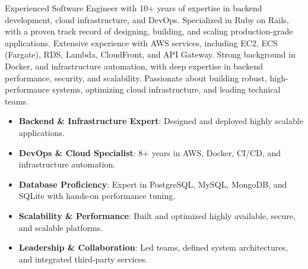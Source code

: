 \documentclass[10pt,a4paper,ragged2e,withhyper]{altacv}
\begin{document}
\begin{paracol}{2}
Experienced Software Engineer with 10+ years of expertise in backend development, cloud infrastructure, and DevOps. Specialized in Ruby on Rails, with a proven track record of designing, building, and scaling production-grade applications. Extensive experience with AWS services, including EC2, ECS (Fargate), RDS, Lambda, CloudFront, and API Gateway. Strong background in Docker, and infrastructure automation, with deep expertise in backend performance, security, and scalability. Passionate about building robust, high-performance systems, optimizing cloud infrastructure, and leading technical teams.

\vspace{10pt}
\begin{itemize}
    \setlength\itemsep{5pt}
    \item \textbf{Backend \& Infrastructure Expert}: Designed and deployed highly scalable applications.
    \item \textbf{DevOps \& Cloud Specialist}: 8+ years in AWS, Docker, CI/CD, and infrastructure automation.
    \item \textbf{Database Proficiency}: Expert in PostgreSQL, MySQL, MongoDB, and SQLite with hands-on performance tuning.
    \item \textbf{Scalability \& Performance}: Built and optimized highly available, secure, and scalable platforms.
    \item \textbf{Leadership \& Collaboration}: Led teams, defined system architectures, and integrated third-party services.
    
\end{itemize}



\end{paracol}
\end{document}
